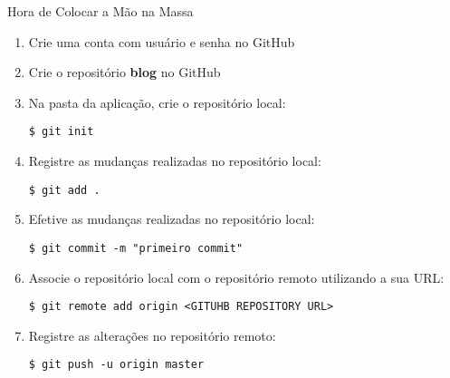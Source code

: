 \begin{frame}{Hora de Colocar a Mão na Massa}
	\begin{enumerate}
		\item Crie uma conta com usuário e senha no GitHub
		\item Crie o repositório {\bf blog} no GitHub
		\item Na pasta da aplicação, crie o repositório local:
		\begin{lstlisting}[style=BashInputBasicStyle]
			$ git init
		\end{lstlisting}
		
		\item Registre as mudanças realizadas no repositório local:
		\begin{lstlisting}[style=BashInputBasicStyle]
			$ git add .
		\end{lstlisting}

        \item Efetive as mudanças realizadas no repositório local:  		
        \begin{lstlisting}[style=BashInputBasicStyle]
			$ git commit -m "primeiro commit"
		\end{lstlisting}

		\item Associe o repositório local com o repositório remoto utilizando a sua URL:
		\begin{lstlisting}[style=BashInputBasicStyle]
			$ git remote add origin <GITUHB REPOSITORY URL>
		\end{lstlisting}

		\item Registre as alterações no repositório remoto:
		\begin{lstlisting}[style=BashInputBasicStyle]
			$ git push -u origin master
		\end{lstlisting}
	\end{enumerate}
\end{frame}
